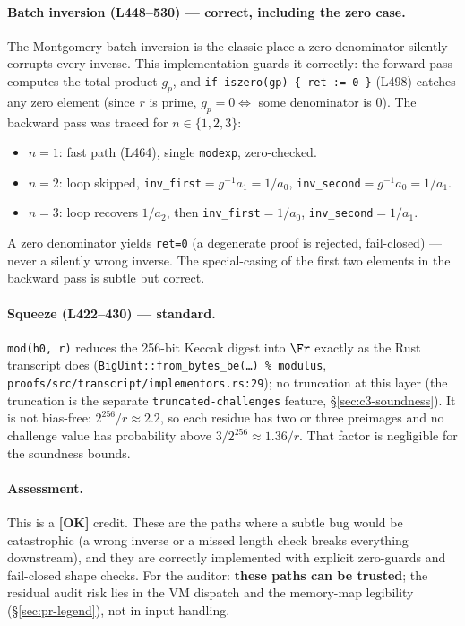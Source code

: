 \paragraph{Batch inversion (L448--530) --- correct, including the
zero case.}
The Montgomery batch inversion is the classic place a zero
denominator silently corrupts every inverse. This implementation
guards it correctly: the forward pass computes the total product
$g_p$, and \texttt{if iszero(gp) \{ ret := 0 \}} (L498) catches
any zero element (since $r$ is prime, $g_p = 0 \iff$ some
denominator is $0$). The backward pass was traced for
$n \in \{1, 2, 3\}$:
\begin{itemize}[leftmargin=1.4em,itemsep=2pt]
\item $n{=}1$: fast path (L464), single \texttt{modexp},
  zero-checked.
\item $n{=}2$: loop skipped, \texttt{inv\_first}$=g^{-1}a_1 =
  1/a_0$, \texttt{inv\_second}$=g^{-1}a_0 = 1/a_1$. \checkmark
\item $n{=}3$: loop recovers $1/a_2$, then
  \texttt{inv\_first}$=1/a_0$, \texttt{inv\_second}$=1/a_1$.
  \checkmark
\end{itemize}
A zero denominator yields \texttt{ret=0} (a degenerate proof is
rejected, fail-closed) --- never a silently wrong inverse. The
special-casing of the first two elements in the backward pass is
subtle but correct.

\paragraph{Squeeze (L422--430) --- standard.}
\texttt{mod(h0, r)} reduces the 256-bit Keccak digest
into $\Fr$ exactly as the Rust transcript does
(\texttt{BigUint::from\_\allowbreak{}bytes\_\allowbreak{}be(\ldots) \% modulus},
\texttt{proofs/\allowbreak{}src/\allowbreak{}transcript/\allowbreak{}implementors.rs:29}); no truncation at
this layer (the truncation is the separate
\texttt{truncated-challenges} feature, \S\ref{sec:c3-soundness}).
 It is not bias-free: $2^{256}/r \approx 2.2$, so
each residue has two or three preimages and no challenge value has
probability above $3/2^{256} \approx 1.36/r$. That factor is
negligible for the soundness bounds.

\paragraph{Assessment.} This is a
\textcolor{tracegreen}{\textbf{[OK]}} credit. These are the
paths where a subtle bug would be catastrophic (a wrong inverse
or a missed length check breaks everything downstream), and they
are correctly implemented with explicit zero-guards and
fail-closed shape checks. For the auditor: \textbf{these paths
can be trusted}; the residual audit risk lies in the VM dispatch
and the memory-map legibility (\S\ref{sec:pr-legend}), not in
input handling.

